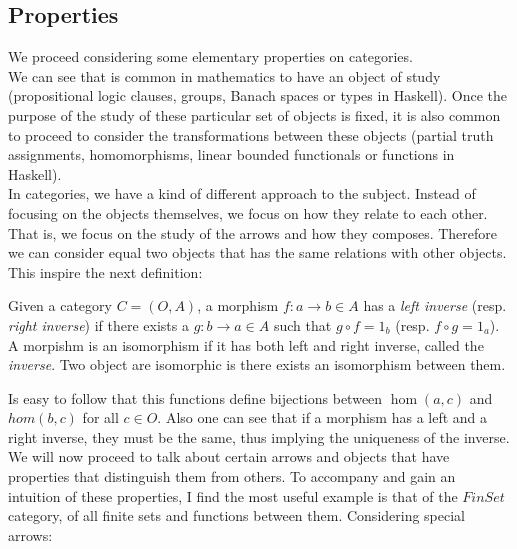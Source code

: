 \subsection{Properties}
We proceed considering some elementary properties on categories.\\

We can see that is common in mathematics to have an object of study (propositional logic clauses, groups, Banach spaces or types in Haskell). Once the purpose of the study of these particular set of objects is fixed, it is also common to proceed to consider the transformations between these objects (partial truth assignments, homomorphisms, linear bounded functionals or  functions in Haskell).\\

In categories, we have a kind of different approach to the subject. Instead of focusing on the objects themselves, we focus on how they relate to each other. That is, we focus on the study of the arrows and how they composes. Therefore we can consider equal two objects that has the same relations with other objects. This inspire the next definition:

\begin{definition}
  Given a category $C=(O,A)$, a morphism $f: a \to b \in A$ has a \emph{left inverse} (resp. \emph{right inverse}) if there exists a $g: b \to a \in A$ such that $g \circ f = 1_b$ (resp. $f \circ g = 1_a$). A morpishm is an isomorphism if it has both left and right inverse, called the \emph{inverse}. Two object are isomorphic is there exists an isomorphism between them.
\end{definition}


Is easy to follow that this functions define bijections between $\hom(a,c)$ and $hom(b,c)$ for all $c\in O$. Also one can see that if a morphism has a left and a right inverse, they must be the same, thus implying the uniqueness of the inverse.\\


We will now proceed to talk about certain arrows and objects that have properties that distinguish them from others. To accompany and gain an intuition of these properties, I find the most useful example is that of the $FinSet$ category, of all finite sets and functions between them.  Considering special arrows:\\

